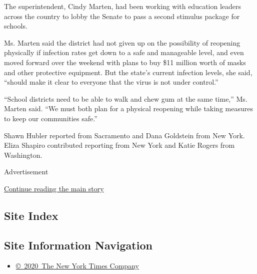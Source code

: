 The superintendent, Cindy Marten, had been working with education
leaders across the country to lobby the Senate to pass a second stimulus
package for schools.

Ms. Marten said the district had not given up on the possibility of
reopening physically if infection rates get down to a safe and
manageable level, and even moved forward over the weekend with plans to
buy \$11 million worth of masks and other protective equipment. But the
state's current infection levels, she said, ``should make it clear to
everyone that the virus is not under control.''

``School districts need to be able to walk and chew gum at the same
time,'' Ms. Marten said. ``We must both plan for a physical reopening
while taking measures to keep our communities safe.''

Shawn Hubler reported from Sacramento and Dana Goldstein from New York.
Eliza Shapiro contributed reporting from New York and Katie Rogers from
Washington.

Advertisement

\protect\hyperlink{after-bottom}{Continue reading the main story}

\hypertarget{site-index}{%
\subsection{Site Index}\label{site-index}}

\hypertarget{site-information-navigation}{%
\subsection{Site Information
Navigation}\label{site-information-navigation}}

\begin{itemize}
\tightlist
\item
  \href{https://help.nytimes3xbfgragh.onion/hc/en-us/articles/115014792127-Copyright-notice}{©~2020~The
  New York Times Company}
\end{itemize}

